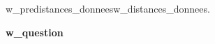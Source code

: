 \begin{exo}
    {w_predistances_donnees}{w_distances_donnees}.

    \textbf{{w_question}}
\end{exo}

\begin{center}

\end{center}

